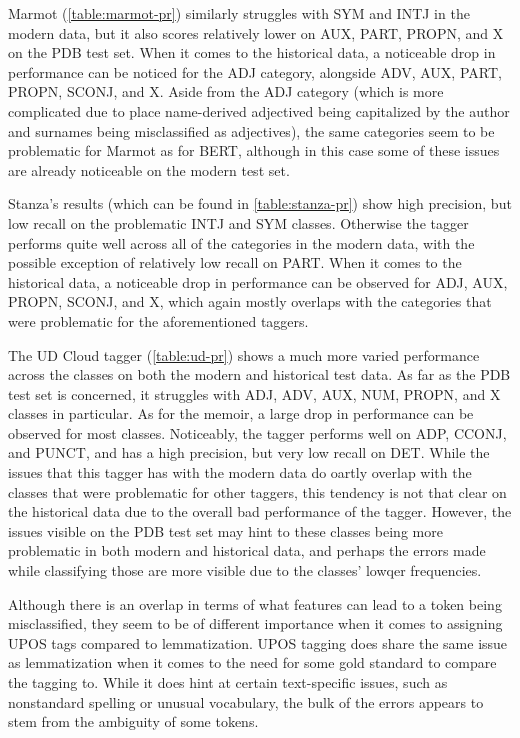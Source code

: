 Marmot (\autoref{table:marmot-pr}) similarly struggles with SYM and INTJ in the modern data, but it also scores relatively lower on AUX, PART, PROPN, and X on the PDB test set. When it comes to the historical data, a noticeable drop in performance can be noticed for the ADJ category, alongside ADV, AUX, PART, PROPN, SCONJ, and X. Aside from the ADJ category (which is more complicated due to place name-derived adjectived being capitalized by the author and surnames being misclassified as adjectives), the same categories seem to be problematic for Marmot as for BERT, although in this case some of these issues are already noticeable on the modern test set.

Stanza's results (which can be found in \autoref{table:stanza-pr}) show high precision, but low recall on the problematic INTJ and SYM classes. Otherwise the tagger performs quite well across all of the categories in the modern data, with the possible exception of relatively low recall on PART. When it comes to the historical data, a noticeable drop in performance can be observed for ADJ, AUX, PROPN, SCONJ, and X, which again mostly overlaps with the categories that were problematic for the aforementioned taggers.

The UD Cloud tagger (\autoref{table:ud-pr}) shows a much more varied performance across the classes on both the modern and historical test data. As far as the PDB test set is concerned, it struggles with ADJ, ADV, AUX, NUM, PROPN, and X classes in particular. As for the memoir, a large drop in performance can be observed for most classes. Noticeably, the tagger performs well on ADP, CCONJ, and PUNCT, and has a high precision, but very low recall on DET. While the issues that this tagger has with the modern data do oartly overlap with the classes that were problematic for other taggers, this tendency is not that clear on the historical data due to the overall bad performance of the tagger. However, the issues visible on the PDB test set may hint to these classes being more problematic in both modern and historical data, and perhaps the errors made while classifying those are more visible due to the classes' lowqer frequencies.

Although there is an overlap in terms of what features can lead to a token being misclassified, they seem to be of different importance when it comes to assigning UPOS tags compared to lemmatization. UPOS tagging does share the same issue as lemmatization when it comes to the need for some gold standard to compare the tagging to. While it does hint at certain text-specific issues, such as nonstandard spelling or unusual vocabulary, the bulk of the errors appears to stem from the ambiguity of some tokens.

